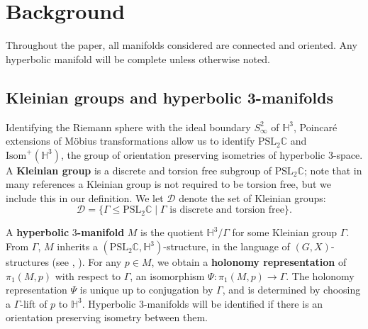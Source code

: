\documentclass[11pt,leqno]{article}
\theoremstyle{introdef}
\numberwithin{lemma}{section}
\theoremstyle{definition}
\newcommand{\C}{\mathbb{C}}
\begin{document}

\section{Background}
\label{sec-background}


Throughout the paper, all manifolds considered are connected and oriented. Any hyperbolic manifold will be complete unless otherwise noted.






\subsection{Kleinian groups and hyperbolic 3-manifolds}

\label{KGroupBackground}
Identifying the Riemann sphere with the ideal boundary $S^2_\infty$ of $\mathbb{H}^3$, Poincar\'{e} extensions of M\"{o}bius transformations allow us to identify $\mathrm{PSL}_2\C$ and $\mathrm{Isom}^+(\mathbb{H}^3)$, the group of orientation preserving isometries of hyperbolic $3$-space. A \textbf{Kleinian group} is a discrete and torsion free subgroup of $\mathrm{PSL}_2\mathbb{C}$; note that in many references a Kleinian group is not required to be torsion free, but we include this in our definition. We let $\mathcal{D}$ denote the set of Kleinian groups: \[\mathcal{D}=\{\Gamma\leq\mathrm{PSL}_2\C \;|\; \Gamma\text{ is discrete and torsion free}\}.\]\par

A \textbf{hyperbolic }$3$\textbf{-manifold} $M$ is the quotient $\mathbb{H}^3/\Gamma$ for some Kleinian group $\Gamma$. From $\Gamma$, $M$ inherits a $(\mathrm{PSL}_2\C,\mathbb{H}^3)$-structure, in the language of $(G,X)$-structures (see \cite{THUR}, \cite{BEN}). For any $p\in M$, we obtain a \textbf{holonomy representation} of $\pi_1(M,p)$ with respect to $\Gamma$, an isomorphism $\Psi:\pi_1(M,p)\rightarrow \Gamma$. The holonomy representation $\Psi$ is unique up to conjugation by $\Gamma$, and is determined by choosing a $\Gamma$-lift of $p$ to $\mathbb{H}^3$. Hyperbolic $3$-manifolds will be identified if there is an orientation preserving isometry between them.\par
\end{document}
